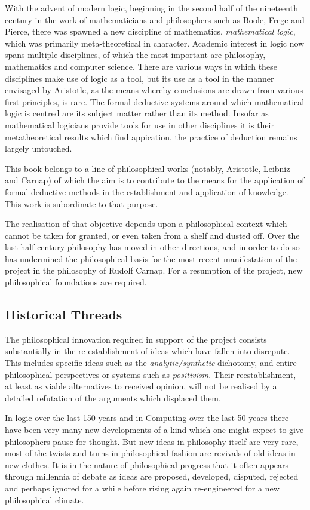 With the advent of modern logic, beginning in the second half of the
nineteenth century in the work of mathematicians and philosophers such as Boole,
Frege and Pierce, there was spawned a new discipline of mathematics,
{\it mathematical logic}, which was primarily meta-theoretical in
character.
Academic interest in logic now spans multiple disciplines, of which
the most important are philosophy, mathematics and computer science.
There are various ways in which these disciplines make use of
logic as a tool, but its use as a tool in the manner envisaged by
Aristotle, as the means whereby conclusions are drawn from various
first principles, is rare.
The formal deductive systems around which mathematical logic is centred
are its subject matter rather than its method.
Insofar as mathematical logicians provide tools for use in other
disciplines it is their metatheoretical results which find 
appication, the practice of deduction remains largely untouched.

This book belongs to a line of philosophical works (notably,
Aristotle, Leibniz and Carnap) of which the aim is
to contribute to the means for the application of formal deductive
methods in the establishment and application of knowledge.
This work is subordinate to that purpose.

The realisation of that objective depends upon a philosophical
context which cannot be taken for granted, or even taken from a shelf
and dusted off.
Over the last half-century philosophy has moved in other directions,
and in order to do so has undermined the philosophical basis for the
most recent manifestation of the project in the philosophy of Rudolf
Carnap.
For a resumption of the project, new philosophical foundations are
required.

\subsection{Historical Threads}

The philosophical innovation required in support of the project
consists substantially in the re-establishment of ideas which have
fallen into disrepute.
This includes specific ideas such as the {\it analytic/synthetic}
dichotomy, and entire philosophical perspectives or systems such as
{\it positivism}.
Their reestablishment, at least as viable alternatives to received
opinion, will not be realised by a detailed refutation of the
arguments which displaced them.


In logic over the last 150 years and in Computing over the last 50
years there have been very many new developments of a kind which one
might expect to give philosophers pause for thought.
But new ideas in philosophy itself are very rare, most of the twists
and turns in philosophical fashion are revivals of old ideas in new
clothes.
It is in the nature of philosophical progress that it often appears
through millennia of debate as ideas are proposed, developed, disputed,
rejected and perhaps ignored for a while before rising again
re-engineered for a new philosophical climate.

